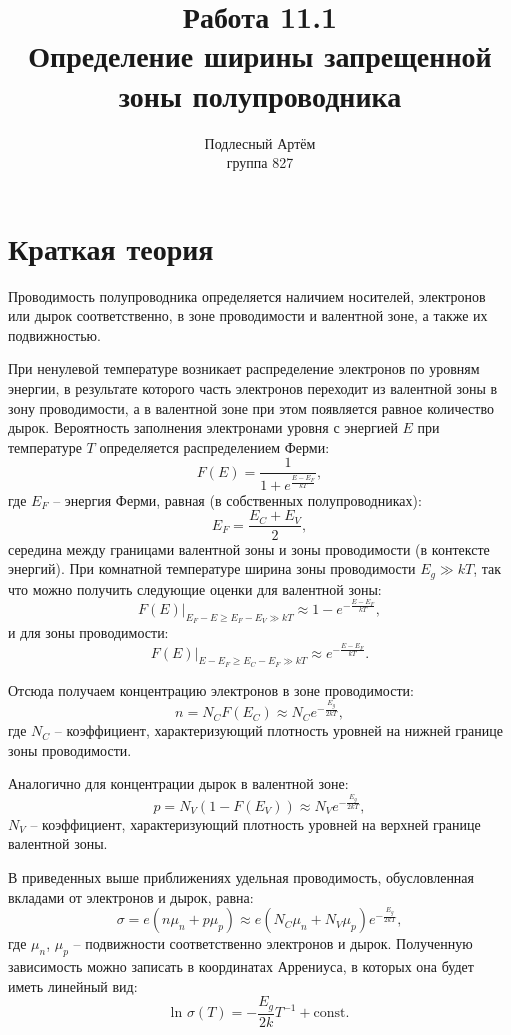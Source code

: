 \documentclass[a4paper, 14pt]{extarticle}%
\author{Подлесный Артём \\ группа 827}
\title{Работа 11.1 \\ Определение ширины запрещенной зоны полупроводника}
\begin{document}
\maketitle

\section*{Краткая теория}

Проводимость полупроводника определяется наличием носителей, электронов или дырок соответственно, в зоне проводимости и валентной зоне, а
также их подвижностью.

При ненулевой температуре возникает распределение электронов по уровням энергии, в результате которого часть
электронов переходит из валентной зоны в зону проводимости, а в валентной зоне при этом появляется равное количество дырок. Вероятность заполнения электронами уровня с энергией $ E $ при температуре $ T $ определяется распределением Ферми:
\begin{equation}
F(E) = \frac{1}{1 + e^{\frac{E-E_F}{kT}}},
\end{equation}
где $E_F$ -- энергия Ферми, равная (в собственных полупроводниках):
\begin{equation}
E_F = \frac{E_C+E_V}{2},
\end{equation}
середина между границами валентной зоны и зоны проводимости (в контексте энергий). При комнатной температуре ширина зоны проводимости $E_g \gg kT$, так что можно получить следующие оценки для валентной зоны:
\[ F(E)|_{E_F - E\geq E_F - E_V\gg kT} \approx 1 - e^{-\frac{E-E_F}{kT}},\]
и для зоны проводимости:
\[ F(E)|_{E - E_F \geq E_C - E_F \gg kT} \approx e^{-\frac{E-E_F}{kT}}.\]

Отсюда получаем концентрацию электронов в зоне проводимости:
\begin{equation}
n = N_C F(E_C)\approx N_C e^{-\frac{E_g}{2kT}},
\end{equation}
где $N_C$ -- коэффициент, характеризующий плотность уровней на нижней границе зоны проводимости.

Аналогично для концентрации дырок в валентной зоне:
\begin{equation}
p = N_V(1 - F(E_V))\approx N_V e^{-\frac{E_g}{2kT}},
\end{equation}
$N_V$ -- коэффициент, характеризующий плотность уровней на верхней
границе валентной зоны.

В приведенных выше приближениях удельная проводимость, обусловленная вкладами от электронов и дырок, равна:
\begin{equation}
\sigma = e(n\mu_n + p\mu_p) \approx e(N_C\mu_n + N_V\mu_p)e^{-\frac{E_g}{2kT}},
\end{equation}
где $\mu_n$, $\mu_p$ -- подвижности соответственно электронов
и дырок. Полученную зависимость можно записать в координатах Аррениуса, в которых она будет иметь линейный вид:
\begin{equation}
\text{ln }\sigma(T) = -\frac{E_g}{2k}T^{-1} + \text{const}.
\end{equation}
\end{document}
